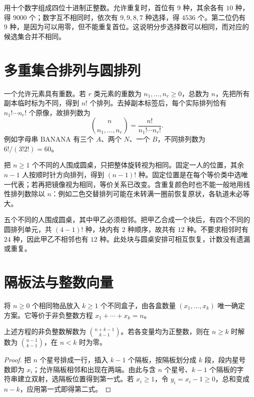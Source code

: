 \documentclass[UTF8,12pt,a4paper,fontset=fandol]{ctexbook}
\begin{document}
\begin{example}
用十个数字组成四位十进制正整数。允许重复时，首位有 $9$ 种，其余各有 $10$ 种，得 $9000$ 个；数字互不相同时，依次有 $9,9,8,7$ 种选择，得 $4536$ 个。第二位仍有 $9$ 种，是因为可以用零，但不能重复首位。这说明分步选择数可以相同，而对应的候选集合并不相同。
\end{example}

\section{多重集合排列与圆排列}

一个允许元素具有重数。若 $r$ 类元素的重数为 $n_1,\ldots,n_r\ge0$，总数为 $n$，先把所有副本临时标为不同，得到 $n!$ 个排列。去掉副本标签后，每个实际排列恰有 $n_1!\cdots n_r!$ 个原像，故排列数为
\begin{equation}
  \binom{n}{n_1,\ldots,n_r}=\frac{n!}{n_1!\cdots n_r!}.
  \label{eq:multinomial-count}
\end{equation}
例如字母串 $\mathrm{BANANA}$ 有三个 $A$、两个 $N$、一个 $B$，不同排列数为 $6!/(3!2!)=60$。

把 $n\ge1$ 个不同的人围成圆桌，只把整体旋转视为相同。固定一人的位置，其余 $n-1$ 人按顺时针方向排列，得到 $(n-1)!$ 种。固定位置是在每个等价类中选唯一代表；若再把镜像视为相同，等价关系已改变。含重复颜色时也不能一般地用线性排列数除以 $n$：例如二色交替排列可能在未转满一圈前恢复原状，各轨道未必等大。

\begin{example}
五个不同的人围成圆桌，其中甲乙必须相邻。把甲乙合成一个块后，有四个不同的圆排列单元，共 $(4-1)!$ 种，块内有 $2$ 种顺序，故共有 $12$ 种。不要求相邻时有 $24$ 种，因此甲乙不相邻也有 $12$ 种。此处块与圆桌安排可相互恢复，计数没有遗漏或重复。
\end{example}

\section{隔板法与整数向量}

将 $n\ge0$ 个相同物品放入 $k\ge1$ 个不同盒子，由各盒数量 $(x_1,\ldots,x_k)$ 唯一确定方案。它等价于非负整数方程 $x_1+\cdots+x_k=n$。

\begin{theorem}
上述方程的非负整数解数为 $\binom{n+k-1}{k-1}$。若各变量均为正整数，则在 $n\ge k$ 时解数为 $\binom{n-1}{k-1}$，在 $n<k$ 时为零。
\end{theorem}
\begin{proof}
把 $n$ 个星号排成一行，插入 $k-1$ 个隔板，按隔板划分成 $k$ 段，段内星号数即为 $x_i$；允许隔板相邻和出现在两端。由此与含 $n$ 个星号、$k-1$ 个隔板的字符串建立双射，选隔板位置得到第一式。若 $x_i\ge1$，令 $y_i=x_i-1\ge0$，总和变成 $n-k$，应用第一式即得第二式。
\end{proof}
\end{document}
